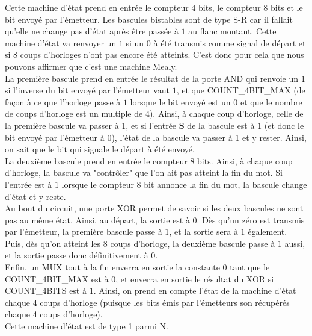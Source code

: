 \documentclass[a4paper]{article} %
\begin{document}
\begin{tcolorbox}[colframe=Monokaimagenta,colback=white]
Cette machine d'état prend en entrée le compteur 4 bits, le compteur 8 bits et le bit envoyé par l'émetteur. Les bascules bistables sont de type S-R car il fallait qu'elle ne change pas d'état après être passée à $1$ au flanc montant. Cette machine d'état va renvoyer un $1$ si un $0$ à été transmis comme signal de départ et si 8 coups d'horloges n'ont pas encore été atteints. C'est donc pour cela que nous pouvons affirmer que c'est une machine Mealy.\\
La première bascule prend en entrée le résultat de la porte AND qui renvoie un $1$ si l'inverse du bit envoyé par l'émetteur vaut $1$, et que COUNT\_4BIT\_MAX (de façon à ce que l'horloge passe à $1$ lorsque le bit envoyé est un $0$ et que le nombre de coups d'horloge est un multiple de 4). Ainsi, à chaque coup d'horloge, celle de la première bascule va passer à 1, et si l'entrée \textbf{S} de la bascule est à $1$ (et donc le bit envoyé par l'émetteur à $0$), l'état de la bascule va passer à 1 et y rester. Ainsi, on sait que le bit qui signale le départ à été envoyé.\\
La deuxième bascule prend en entrée le compteur 8 bits. Ainsi, à chaque coup d'horloge, la bascule va "contrôler" que l'on ait pas atteint la fin du mot. Si l'entrée est à $1$ lorsque le compteur 8 bit annonce la fin du mot, la bascule change d'état et y reste.\\
Au bout du circuit, une porte XOR permet de savoir si les deux bascules ne sont pas au même état.
Ainsi, au départ, la sortie est à 0. Dès qu'un zéro est transmis par l'émetteur, la première bascule passe à $1$, et la sortie sera à $1$ également. Puis, dès qu'on atteint les 8 coups d'horloge, la deuxième bascule passe à $1$ aussi, et la sortie passe donc définitivement à $0$.\\
Enfin, un MUX tout à la fin enverra en sortie la constante $0$ tant que le COUNT\_4BIT\_MAX est à $0$, et enverra en sortie le résultat du XOR si COUNT\_4BITS est à $1$. Ainsi, on prend en compte l'état de la machine d'état chaque 4 coups d'horloge (puisque les bits émis par l'émetteurs son récupérés chaque 4 coups d'horloge).\\
Cette machine d'état est de type 1 parmi N.
\end{tcolorbox}
\end{document}
